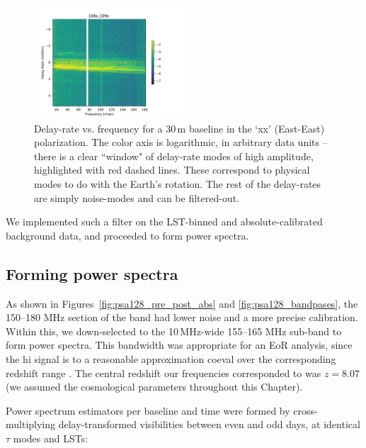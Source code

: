 \begin{figure}
\centering
\includegraphics[width=0.5\textwidth]{chapters/psa128_pol/figures/fringerate_example.pdf}
\caption[Delay-rate vs. frequency for a 30\,m baseline in the `xx' (East-East) polarization.]{Delay-rate vs. frequency for a 30\,m baseline in the `xx' (East-East) polarization. The color axis is logarithmic, in arbitrary data units -- there is a clear ``window" of delay-rate modes of high amplitude, highlighted with red dashed lines. These correspond to physical modes to do with the Earth's rotation. The rest of the delay-rates are simply noise-modes and can be filtered-out.}
\label{fig:fringerate_example}
\end{figure}

We implemented such a filter on the LST-binned and absolute-calibrated background data, and proceeded to form power spectra.

\subsection{Forming power spectra}

As shown in Figures~\ref{fig:psa128_pre_post_abs} and \ref{fig:psa128_bandpases}, the 150--180 MHz section of the band had lower noise and a more precise calibration. Within this, we down-selected to the 10\,MHz-wide 155--165 MHz sub-band to form power spectra. This bandwidth was appropriate for an EoR analysis, since the {\sc hi} signal is to a reasonable approximation coeval over the corresponding redshift range \citep{Furlanetto.06}. The central redshift our frequencies corresponded to was $z=8.07$ (we assumed the \cite{Planck.16} cosmological parameters throughout this Chapter).

Power spectrum estimators per baseline and time were formed by cross-multiplying delay-transformed visibilities between even and odd days, at identical $\tau$ modes and LSTs:

